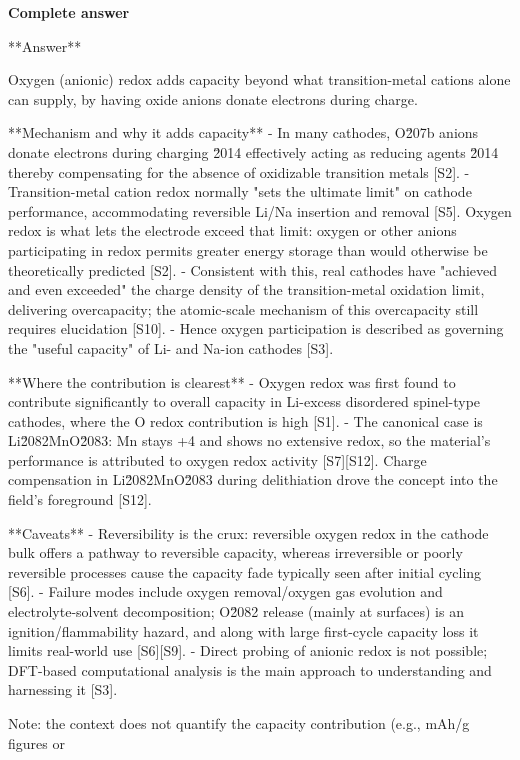 \documentclass[10pt]{article}
\begin{document}
\textbf{Complete answer}
\begin{AnswerText}
**Answer**

Oxygen (anionic) redox adds capacity beyond what transition-metal cations alone can supply, by having oxide anions donate electrons during charge.

**Mechanism and why it adds capacity**
- In many cathodes, O\u207b anions donate electrons during charging \u2014 effectively acting as reducing agents \u2014 thereby compensating for the absence of oxidizable transition metals [S2].
- Transition-metal cation redox normally "sets the ultimate limit" on cathode performance, accommodating reversible Li/Na insertion and removal [S5]. Oxygen redox is what lets the electrode exceed that limit: oxygen or other anions participating in redox permits greater energy storage than would otherwise be theoretically predicted [S2].
- Consistent with this, real cathodes have "achieved and even exceeded" the charge density of the transition-metal oxidation limit, delivering overcapacity; the atomic-scale mechanism of this overcapacity still requires elucidation [S10].
- Hence oxygen participation is described as governing the "useful capacity" of Li- and Na-ion cathodes [S3].

**Where the contribution is clearest**
- Oxygen redox was first found to contribute significantly to overall capacity in Li-excess disordered spinel-type cathodes, where the O redox contribution is high [S1].
- The canonical case is Li\u2082MnO\u2083: Mn stays +4 and shows no extensive redox, so the material's performance is attributed to oxygen redox activity [S7][S12]. Charge compensation in Li\u2082MnO\u2083 during delithiation drove the concept into the field's foreground [S12].

**Caveats**
- Reversibility is the crux: reversible oxygen redox in the cathode bulk offers a pathway to reversible capacity, whereas irreversible or poorly reversible processes cause the capacity fade typically seen after initial cycling [S6].
- Failure modes include oxygen removal/oxygen gas evolution and electrolyte-solvent decomposition; O\u2082 release (mainly at surfaces) is an ignition/flammability hazard, and along with large first-cycle capacity loss it limits real-world use [S6][S9].
- Direct probing of anionic redox is not possible; DFT-based computational analysis is the main approach to understanding and harnessing it [S3].

Note: the context does not quantify the capacity contribution (e.g., mAh/g figures or %
\end{AnswerText}
\end{document}
